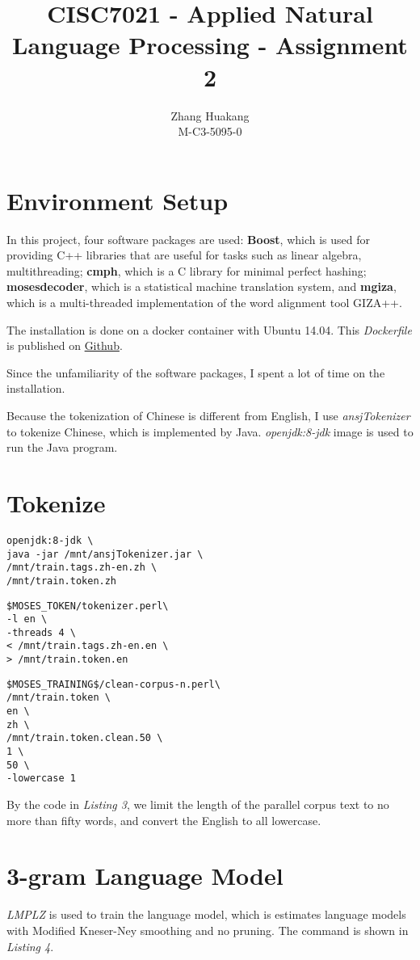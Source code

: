 \documentclass[11pt]{article}
\title{CISC7021 - Applied Natural Language Processing - Assignment 2}
\author{Zhang Huakang\\
M-C3-5095-0
}
\date{}
\begin{document}
\maketitle

\section{Environment Setup}
In this project, four software packages are used: \textbf{Boost}, which is used for providing C++ libraries that are useful for tasks such as linear algebra, multithreading; \textbf{cmph}, which is a C library for minimal perfect hashing; \textbf{mosesdecoder}, which is a statistical machine translation system, and \textbf{mgiza}, which is a multi-threaded implementation of the word alignment tool GIZA++. 

The installation is done on a docker container with Ubuntu 14.04. This \textit{Dockerfile} is published on \href{https://github.com/BoxMars/NLP-HW/blob/main/Assignment2/Dockerfile}{Github}.

Since the unfamiliarity of the software packages, I spent a lot of time on the installation.

Because the tokenization of Chinese is different from English, I use \textit{ansjTokenizer} to tokenize Chinese, which is implemented by Java. \textit{openjdk:8-jdk} image is used to run the Java program.

\section{Tokenize}
\begin{lstlisting}[caption=Chinese Tokenization]
openjdk:8-jdk \
java -jar /mnt/ansjTokenizer.jar \
/mnt/train.tags.zh-en.zh \
/mnt/train.token.zh 
\end{lstlisting}
\begin{lstlisting}[caption=English Tokenization]
$MOSES_TOKEN/tokenizer.perl\
-l en \
-threads 4 \
< /mnt/train.tags.zh-en.en \
> /mnt/train.token.en 
\end{lstlisting}
\begin{lstlisting}[caption=Reduce Parallel Corpus]
$MOSES_TRAINING$/clean-corpus-n.perl\
/mnt/train.token \
en \
zh \
/mnt/train.token.clean.50 \
1 \
50 \
-lowercase 1
\end{lstlisting}
By the code in \textit{Listing 3}, we limit the length of the parallel corpus text to no more than fifty words, and convert the English to all lowercase.

\section{3-gram Language Model}
\textit{LMPLZ} is used to train the language model, which is estimates language models with Modified Kneser-Ney smoothing and no pruning. The command is shown in \textit{Listing 4}.
\end{document}
